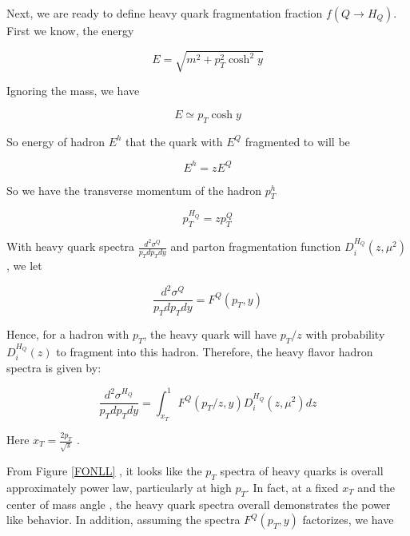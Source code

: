 Next, we are ready to define heavy quark fragmentation fraction $f(Q \rightarrow H_Q)$. First we know, the energy

\begin{equation}
E=  \sqrt{m^2 + p_T^2 \cosh^2 y}
\end{equation}

Ignoring the mass, we have

\begin{equation}
E \simeq p_T \cosh y
\end{equation}

So energy of hadron $E^h$ that the quark with $E^Q$ fragmented to will be


\begin{equation}
E^h  = z E^Q 
\end{equation}

So we have the transverse momentum of the hadron $p_T^h$ 

\begin{equation}
p_T^{H_Q} = z p_T^Q
\end{equation}

With heavy quark spectra $ \frac{d^2\sigma^Q}{p_T dp_T dy}$ and parton fragmentation function $D_{i}^{H_Q}(z,\mu^2)$, we let


\begin{equation}
 \frac{d^2\sigma^Q}{p_T dp_T dy} = F^Q(p_T, y)
\end{equation}


Hence, for a hadron with $p_T$, the heavy quark will have $p_T/z$ with probability $D^{H_Q}_{i}(z)$ to fragment into this hadron. Therefore, the heavy flavor hadron spectra is given by:

\begin{equation}
\frac{d^2\sigma^{H_Q}}{p_T dp_T dy} = \int_{x_T}^1 F^Q(p_T/z, y) D_{i}^{H_Q}(z,\mu^2) dz
\end{equation}

Here $x_T = \frac{2p_T}{\sqrt s}$ \cite{HadronScale}.







\iffalse



From Figure \ref{FONLL} , it looks like the $p_T$ spectra of heavy quarks is overall approximately power law, particularly at high $p_T$. In fact, at a fixed $x_T$ and the center of mass angle \cite{HadronScale}, the heavy quark spectra overall demonstrates the power like behavior. In addition, assuming the spectra $F^Q(p_T,y)$ factorizes, we have
 

